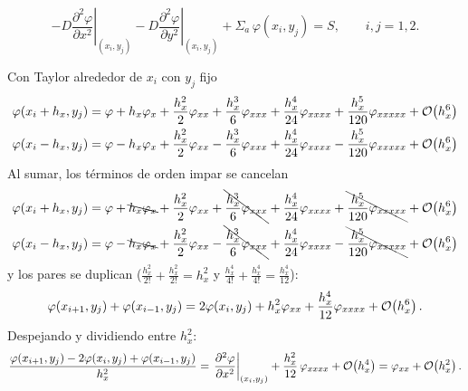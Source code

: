 \[
-D\left.\frac{\partial^2 \varphi}{\partial x^2}\right|_{(x_i,y_j)}
- D\left.\frac{\partial^2 \varphi}{\partial y^2}\right|_{(x_i,y_j)}
+ \Sigma_a\,\varphi(x_i,y_j) = S, \qquad i, j = 1, 2 .
\]

Con Taylor alrededor de $x_i$ con $y_j$ fijo 
\begin{align*}
	\varphi(x_i + h_x, y_j) &= \varphi + h_x \varphi_x + \frac{h_x^2}{2}\varphi_{xx} + \frac{h_x^3}{6}\varphi_{xxx}
	+ \frac{h_x^4}{24}\varphi_{xxxx} + \frac{h_x^5}{120}\varphi_{xxxxx} + \mathcal{O}\!\left(h_x^6\right)\\
	\varphi(x_i - h_x, y_j) &= \varphi - h_x \varphi_x + \frac{h_x^2}{2}\varphi_{xx} - \frac{h_x^3}{6}\varphi_{xxx}
	+ \frac{h_x^4}{24}\varphi_{xxxx} - \frac{h_x^5}{120}\varphi_{xxxxx} + \mathcal{O}\!\left(h_x^6\right)
\end{align*}
Al sumar, los términos de orden impar se cancelan 
\begin{align*}
	\varphi(x_i + h_x, y_j) &= \varphi + \bcancel{h_x \varphi_x} + \frac{h_x^2}{2}\varphi_{xx} + \bcancel{\frac{h_x^3}{6}\varphi_{xxx}}
	+ \frac{h_x^4}{24}\varphi_{xxxx} + \bcancel{\frac{h_x^5}{120}\varphi_{xxxxx}} + \mathcal{O}\!\left(h_x^6\right)\\
	\varphi(x_i - h_x, y_j) &= \varphi - \bcancel{h_x \varphi_x} + \frac{h_x^2}{2}\varphi_{xx} - \bcancel{\frac{h_x^3}{6}\varphi_{xxx}}
	+ \frac{h_x^4}{24}\varphi_{xxxx} - \bcancel{\frac{h_x^5}{120}\varphi_{xxxxx}} + \mathcal{O}\!\left(h_x^6\right)
\end{align*}
y los pares se duplican
($\frac{h_x^2}{2!} + \frac{h_x^2}{2!} = h_x^2$ y $\frac{h_x^4}{4!} + \frac{h_x^4}{4!} = \frac{h_x^4}{12}$):
\[
\varphi(x_{i+1}, y_j) + \varphi(x_{i-1}, y_j) = 2\varphi(x_i, y_j) + h_x^2 \varphi_{xx} + \frac{h_x^4}{12}\varphi_{xxxx} + \mathcal{O}\!\left(h_x^6\right).
\]
Despejando y dividiendo entre $h_x^2$:
\[
\frac{\varphi(x_{i+1}, y_j) - 2\varphi(x_i, y_j) + \varphi(x_{i-1}, y_j)}{h_x^2}
= \left.\frac{\partial^2 \varphi}{\partial x^2}\right|_{(x_i,y_j)} + \frac{h_x^2}{12}\,\varphi_{xxxx} + \mathcal{O}\!\left(h_x^4\right)
= \varphi_{xx} + \mathcal{O}\!\left(h_x^2\right).
\]

